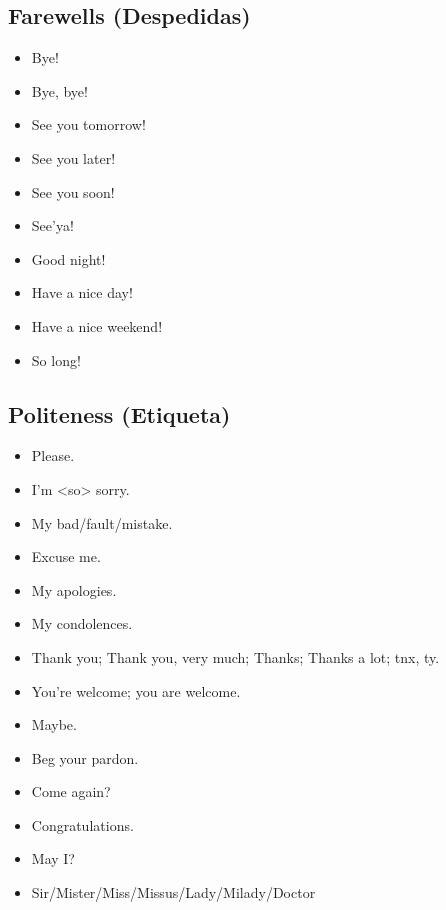 \documentclass[12pt,a4paper]{article} %
\begin{document}
\subsection{Farewells (Despedidas)}
	\begin{itemize}
		\item Bye!
		\item Bye, bye!
		\item See you tomorrow!
		\item See you later!
		\item See you soon!
		\item See'ya!
		\item Good night!
		\item Have a nice day!
		\item Have a nice weekend!
		\item So long!
	\end{itemize}
\subsection{Politeness (Etiqueta)}
	\begin{itemize}
		\item Please.
		\item I'm <so> sorry.
		\item My bad/fault/mistake.
		\item Excuse me.
		\item My apologies.
		\item My condolences.
		\item Thank you; Thank you, very much; Thanks; Thanks a lot; tnx, ty.
		\item You're welcome; you are welcome.
		\item Maybe.
		\item Beg your pardon.
		\item Come again?
		\item Congratulations.
		\item May I?
		\item Sir/Mister/Miss/Missus/Lady/Milady/Doctor
	\end{itemize}
\end{document}
